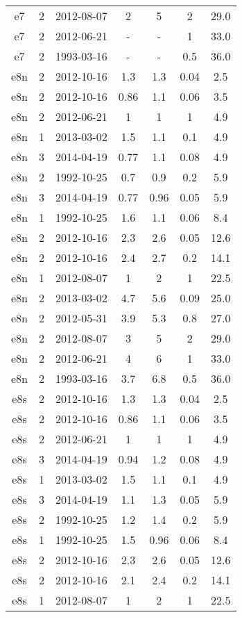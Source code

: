 \begin{table*}[htp]
\begin{tabular}{ccccccc}
e7 & 2 & 2012-08-07 & 2 & 5 & 2 & 29.0 \\
e7 & 2 & 2012-06-21 & - & - & 1 & 33.0 \\
e7 & 2 & 1993-03-16 & - & - & 0.5 & 36.0 \\
e8n & 2 & 2012-10-16 & 1.3 & 1.3 & 0.04 & 2.5 \\
e8n & 2 & 2012-10-16 & 0.86 & 1.1 & 0.06 & 3.5 \\
e8n & 2 & 2012-06-21 & 1 & 1 & 1 & 4.9 \\
e8n & 1 & 2013-03-02 & 1.5 & 1.1 & 0.1 & 4.9 \\
e8n & 3 & 2014-04-19 & 0.77 & 1.1 & 0.08 & 4.9 \\
e8n & 2 & 1992-10-25 & 0.7 & 0.9 & 0.2 & 5.9 \\
e8n & 3 & 2014-04-19 & 0.77 & 0.96 & 0.05 & 5.9 \\
e8n & 1 & 1992-10-25 & 1.6 & 1.1 & 0.06 & 8.4 \\
e8n & 2 & 2012-10-16 & 2.3 & 2.6 & 0.05 & 12.6 \\
e8n & 2 & 2012-10-16 & 2.4 & 2.7 & 0.2 & 14.1 \\
e8n & 1 & 2012-08-07 & 1 & 2 & 1 & 22.5 \\
e8n & 2 & 2013-03-02 & 4.7 & 5.6 & 0.09 & 25.0 \\
e8n & 2 & 2012-05-31 & 3.9 & 5.3 & 0.8 & 27.0 \\
e8n & 2 & 2012-08-07 & 3 & 5 & 2 & 29.0 \\
e8n & 2 & 2012-06-21 & 4 & 6 & 1 & 33.0 \\
e8n & 2 & 1993-03-16 & 3.7 & 6.8 & 0.5 & 36.0 \\
e8s & 2 & 2012-10-16 & 1.3 & 1.3 & 0.04 & 2.5 \\
e8s & 2 & 2012-10-16 & 0.86 & 1.1 & 0.06 & 3.5 \\
e8s & 2 & 2012-06-21 & 1 & 1 & 1 & 4.9 \\
e8s & 3 & 2014-04-19 & 0.94 & 1.2 & 0.08 & 4.9 \\
e8s & 1 & 2013-03-02 & 1.5 & 1.1 & 0.1 & 4.9 \\
e8s & 3 & 2014-04-19 & 1.1 & 1.3 & 0.05 & 5.9 \\
e8s & 2 & 1992-10-25 & 1.2 & 1.4 & 0.2 & 5.9 \\
e8s & 1 & 1992-10-25 & 1.5 & 0.96 & 0.06 & 8.4 \\
e8s & 2 & 2012-10-16 & 2.3 & 2.6 & 0.05 & 12.6 \\
e8s & 2 & 2012-10-16 & 2.1 & 2.4 & 0.2 & 14.1 \\
e8s & 1 & 2012-08-07 & 1 & 2 & 1 & 22.5 \\

\end{tabular}
\end{table*}
